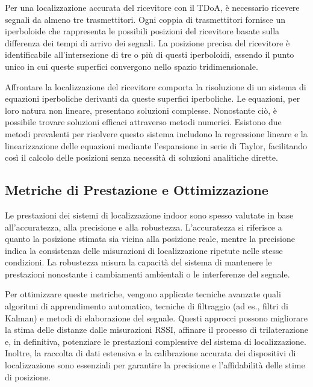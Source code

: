 Per una localizzazione accurata del ricevitore con il TDoA, è necessario ricevere segnali da almeno tre trasmettitori. Ogni coppia di trasmettitori fornisce un iperboloide che rappresenta le possibili posizioni del ricevitore basate sulla differenza dei tempi di arrivo dei segnali. La posizione precisa del ricevitore è identificabile all'intersezione di tre o più di questi iperboloidi, essendo il punto unico in cui queste superfici convergono nello spazio tridimensionale.

Affrontare la localizzazione del ricevitore comporta la risoluzione di un sistema di equazioni iperboliche derivanti da queste superfici iperboliche. Le equazioni, per loro natura non lineare, presentano soluzioni complesse. Nonostante ciò, è possibile trovare soluzioni efficaci attraverso metodi numerici. Esistono due metodi prevalenti per risolvere questo sistema includono la regressione lineare e la linearizzazione delle equazioni mediante l'espansione in serie di Taylor, facilitando così il calcolo delle posizioni senza necessità di soluzioni analitiche dirette.

\subsection{Metriche di Prestazione e Ottimizzazione}
\hspace{\parindent}Le prestazioni dei sistemi di localizzazione indoor sono spesso valutate in base all'accuratezza, alla precisione e alla robustezza. L'accuratezza si riferisce a quanto la posizione stimata sia vicina alla posizione reale, mentre la precisione indica la consistenza delle misurazioni di localizzazione ripetute nelle stesse condizioni. La robustezza misura la capacità del sistema di mantenere le prestazioni nonostante i cambiamenti ambientali o le interferenze del segnale.

Per ottimizzare queste metriche, vengono applicate tecniche avanzate quali algoritmi di apprendimento automatico, tecniche di filtraggio (ad es., filtri di Kalman) e metodi di elaborazione del segnale. Questi approcci possono migliorare la stima delle distanze dalle misurazioni RSSI, affinare il processo di trilaterazione e, in definitiva, potenziare le prestazioni complessive del sistema di localizzazione.  Inoltre, la raccolta di dati estensiva e la calibrazione accurata dei dispositivi di localizzazione sono essenziali per garantire la precisione e l'affidabilità delle stime di posizione.